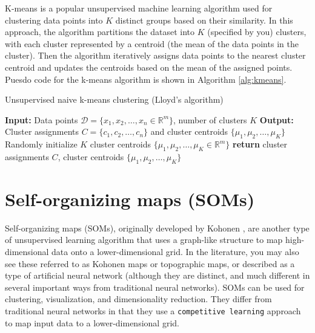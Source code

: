\documentclass{article}[11pt]
\newcommand{\norm}[1]{\left|\left|#1\right|\right|}
\DeclareMathOperator*{\argmin}{arg\,min}
\begin{document}
K-means is a popular unsupervised machine learning algorithm used for clustering data points into $K$ distinct groups based on their similarity.
In this approach, the algorithm partitions the dataset into $K$ (specified by you) clusters, 
with each cluster represented by a centroid (the mean of the data points in the cluster). 
Then the algorithm iteratively assigns data points to the nearest cluster centroid and updates the centroids 
based on the mean of the assigned points.
Puesdo code for the k-means algorithm is shown in Algorithm \ref{alg:kmeans}.

\begin{algorithm}[H]
   \begin{algorithmic}[1]
   \caption{Unsupervised naive k-means clustering (Lloyd's algorithm)}\label{alg:kmeans}
   \State \textbf{Input:} Data points $\mathcal{D} = \{x_1, x_2, \ldots, x_n\in\mathbb{R}^{m}\}$, number of clusters $K$
   \State \textbf{Output:} Cluster assignments $C = \{c_1, c_2, \ldots, c_n\}$ and cluster centroids $\{\mu_1, \mu_2, \ldots, \mu_K\}$
   \State Randomly initialize $K$ cluster centroids $\{\mu_1, \mu_2, \ldots, \mu_K\in\mathbb{R}^{m}\}$
      \State{$c_{i}\gets\underset{j}\argmin \norm{x_{i} - \mu_j}^2$}
   \EndFor 
   \State{$\hat{\mu}\gets\mu$}
   \EndFor
   \If{$\norm{\mu - \hat{\mu}} < \epsilon$}
   \EndIf
   \EndWhile
   \State \textbf{return} cluster assignments $C$, cluster centroids $\{\mu_1, \mu_2, \ldots, \mu_K\}$
   \end{algorithmic}
\end{algorithm}


\section{Self-organizing maps (SOMs)}
Self-organizing maps (SOMs), originally developed by Kohonen \citep{Kohonen:1982aa}, are another type of unsupervised learning algorithm that uses a graph-like structure to map high-dimensional data onto a lower-dimensional grid.
In the literature, you may also see these referred to as Kohonen maps or topographic maps, or described as a type of artificial neural network
(although they are distinct, and much different in several important ways from traditional neural networks).
SOMs can be used for clustering, visualization, and dimensionality reduction. 
They differ from traditional neural networks in that they use a \texttt{competitive learning} approach 
to map input data to a lower-dimensional grid.
\end{document}
